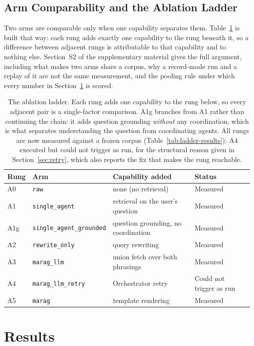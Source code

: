 \documentclass[acmsmall,review,anonymous,screen]{acmart}
\begin{document}
\subsection{Arm Comparability and the Ablation Ladder}\label{sec:ladder}

Two arms are comparable only when one capability separates them.
Table~\ref{tab:ladder} is built that way: each rung adds exactly one capability to the rung
beneath it, so a difference between adjacent rungs is attributable to that
capability and to nothing else. Section~S2 of the supplementary material gives
the full argument, including what makes two arms share a corpus, why a
record-mode run and a replay of it are not the same measurement, and the
pooling rule under which every number in Section~\ref{sec:results} is scored.

\begin{table}[t]
\caption{The ablation ladder. Each rung adds one capability to the rung below,
so every adjacent pair is a single-factor comparison. A1g branches from A1
rather than continuing the chain: it adds question grounding \emph{without}
any coordination, which is what separates understanding the question from
coordinating agents. All rungs are now measured against a frozen corpus
(Table~\ref{tab:ladder-results}); A4 executed but could not trigger as run,
for the structural reason given in Section~\ref{sec:retry}, which also reports
the fix that makes the rung reachable.}
\label{tab:ladder}
\begin{tabular}{llll}
\toprule
Rung & Arm & Capability added & Status \\
\midrule
A0 & \texttt{raw} & none (no retrieval) & Measured \\
A1 & \texttt{single\_agent} & retrieval on the user's question & Measured \\
A1g & \texttt{single\_agent\_grounded} & question grounding, no coordination & Measured \\
A2 & \texttt{rewrite\_only} & query rewriting & Measured \\
A3 & \texttt{marag\_llm} & union fetch over both phrasings & Measured \\
A4 & \texttt{marag\_llm\_retry} & Orchestrator retry & Could not trigger as run \\
A5 & \texttt{marag} & template rendering & Measured \\
\bottomrule
\end{tabular}
\end{table}

\section{Results}\label{sec:results}
\end{document}
